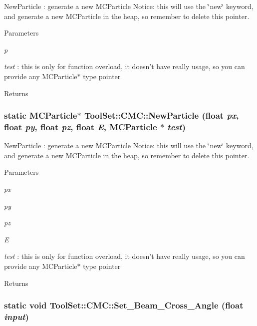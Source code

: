 NewParticle : generate a new MCParticle Notice: this will use the \char`\"{}new\char`\"{} keyword, and generate a new MCParticle in the heap, so remember to delete this pointer. 
\begin{DoxyParams}{Parameters}
\item[{\em p}]\item[{\em test}]: this is only for function overload, it doesn't have really usage, so you can provide any MCParticle$\ast$ type pointer\end{DoxyParams}
\begin{DoxyReturn}{Returns}

\end{DoxyReturn}
\hypertarget{classToolSet_1_1CMC_ab30c29f999f2b3dd1c85ed68636f2281}{
\subsubsection[{NewParticle}]{\setlength{\rightskip}{0pt plus 5cm}static MCParticle$\ast$ ToolSet::CMC::NewParticle (float {\em px}, \/  float {\em py}, \/  float {\em pz}, \/  float {\em E}, \/  MCParticle $\ast$ {\em test})}}
\label{classToolSet_1_1CMC_ab30c29f999f2b3dd1c85ed68636f2281}


NewParticle : generate a new MCParticle Notice: this will use the \char`\"{}new\char`\"{} keyword, and generate a new MCParticle in the heap, so remember to delete this pointer. 
\begin{DoxyParams}{Parameters}
\item[{\em px}]\item[{\em py}]\item[{\em pz}]\item[{\em E}]\item[{\em test}]: this is only for function overload, it doesn't have really usage, so you can provide any MCParticle$\ast$ type pointer\end{DoxyParams}
\begin{DoxyReturn}{Returns}

\end{DoxyReturn}
\hypertarget{classToolSet_1_1CMC_a6d72918adb583b9dcaee3c0c9166f6cb}{
\subsubsection[{Set\_\-Beam\_\-Cross\_\-Angle}]{\setlength{\rightskip}{0pt plus 5cm}static void ToolSet::CMC::Set\_\-Beam\_\-Cross\_\-Angle (float {\em input})}}
\label{classToolSet_1_1CMC_a6d72918adb583b9dcaee3c0c9166f6cb}


